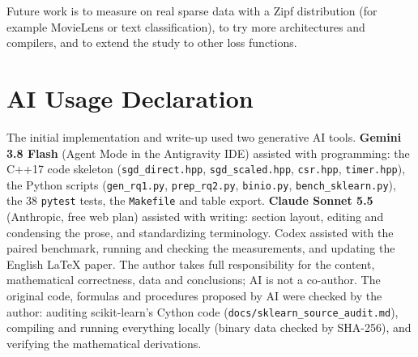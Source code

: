 \documentclass[10pt,a4paper,twocolumn]{article}
\begin{document}
Future work is to measure on real sparse data with a Zipf distribution (for example MovieLens or text classification), to try more architectures and compilers, and to extend the study to other loss functions.

\section*{AI Usage Declaration}
The initial implementation and write-up used two generative AI tools. \textbf{Gemini 3.8 Flash} (Agent Mode in the Antigravity IDE) assisted with programming: the C++17 code skeleton (\texttt{sgd\_direct.hpp}, \texttt{sgd\_scaled.hpp}, \texttt{csr.hpp}, \texttt{timer.hpp}), the Python scripts (\texttt{gen\_rq1.py}, \texttt{prep\_rq2.py}, \texttt{binio.py}, \texttt{bench\_sklearn.py}), the 38 \texttt{pytest} tests, the \texttt{Makefile} and table export. \textbf{Claude Sonnet 5.5} (Anthropic, free web plan) assisted with writing: section layout, editing and condensing the prose, and standardizing terminology. Codex assisted with the paired benchmark, running and checking the measurements, and updating the English LaTeX paper.
The author takes full responsibility for the content, mathematical correctness, data and conclusions; AI is not a co-author. The original code, formulas and procedures proposed by AI were checked by the author: auditing scikit-learn's Cython code (\texttt{docs/sklearn\_source\_audit.md}), compiling and running everything locally (binary data checked by SHA-256), and verifying the mathematical derivations.
\end{document}
